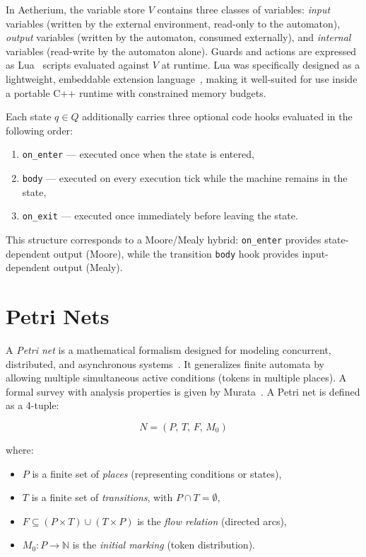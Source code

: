 In Aetherium, the variable store $V$ contains three classes of variables: \textit{input} variables (written by the external environment, read-only to the automaton), \textit{output} variables (written by the automaton, consumed externally), and \textit{internal} variables (read-write by the automaton alone). Guards and actions are expressed as Lua~\cite{Lua1996,LuaManual54} scripts evaluated against $V$ at runtime. Lua was specifically designed as a lightweight, embeddable extension language~\cite{Lua1996}, making it well-suited for use inside a portable C++ runtime with constrained memory budgets.

Each state $q \in Q$ additionally carries three optional code hooks evaluated in the following order:
\begin{enumerate}
  \item \texttt{on\_enter} — executed once when the state is entered,
  \item \texttt{body} — executed on every execution tick while the machine remains in the state,
  \item \texttt{on\_exit} — executed once immediately before leaving the state.
\end{enumerate}

This structure corresponds to a Moore/Mealy hybrid: \texttt{on\_enter} provides state-dependent output (Moore), while the transition \texttt{body} hook provides input-dependent output (Mealy).

\section{Petri Nets}
\label{sec:petri}

A \textit{Petri net} is a mathematical formalism designed for modeling concurrent, distributed, and asynchronous systems~\cite{Petri1962}. It generalizes finite automata by allowing multiple simultaneous active conditions (tokens in multiple places). A formal survey with analysis properties is given by Murata~\cite{Murata1989}. A Petri net is defined as a 4-tuple:

\begin{equation}
  N = (P,\, T,\, F,\, M_0)
\end{equation}

\noindent where:
\begin{itemize}
  \item $P$ is a finite set of \textit{places} (representing conditions or states),
  \item $T$ is a finite set of \textit{transitions}, with $P \cap T = \emptyset$,
  \item $F \subseteq (P \times T) \cup (T \times P)$ is the \textit{flow relation} (directed arcs),
  \item $M_0 : P \rightarrow \mathbb{N}$ is the \textit{initial marking} (token distribution).
\end{itemize}

